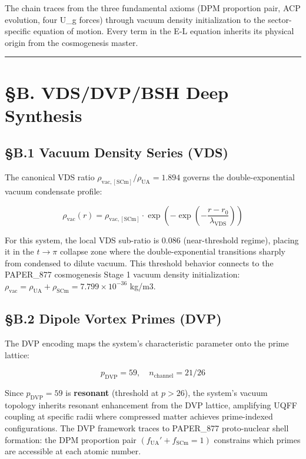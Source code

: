 \documentclass[12pt,a4paper]{article}
\begin{document}
The chain traces from the three fundamental axioms (DPM proportion pair, ACP evolution, four U\_g forces) through vacuum density initialization to the sector-specific equation of motion. Every term in the E-L equation inherits its physical origin from the cosmogenesis master.

\medskip\hrule\medskip

\section{\S{}B. VDS/DVP/BSH Deep Synthesis}

\subsection{\S{}B.1 Vacuum Density Series (VDS)}

The canonical VDS ratio $\rho_{\mathrm{vac,[SCm]}} / \rho_{\mathrm{UA}} = 1.894$ governs the double-exponential vacuum condensate profile:

\begin{equation}
\rho_{\mathrm{vac}}(r) = \rho_{\mathrm{vac,[SCm]}} \cdot \exp\!\left(-\exp\!\left(-\frac{r - r_0}{\lambda_{\mathrm{VDS}}}\right)\right)
\end{equation}

For this system, the local VDS sub-ratio is $0.086$ (near-threshold regime), placing it in the $t \to \pi$ collapse zone where the double-exponential transitions sharply from condensed to dilute vacuum. This threshold behavior connects to the PAPER\_877 cosmogenesis Stage 1 vacuum density initialization: $\rho_{\mathrm{vac}} = \rho_{\mathrm{UA}} + \rho_{\mathrm{SCm}} = 7.799 \times 10^{-36}$ kg/m3.

\subsection{\S{}B.2 Dipole Vortex Primes (DVP)}

The DVP encoding maps the system's characteristic parameter onto the prime lattice:

\begin{equation}
p_{\mathrm{DVP}} = 59, \quad n_{\mathrm{channel}} = 21/26
\end{equation}

Since $p_{\mathrm{DVP}} = 59$ is \textbf{resonant} (threshold at $p > 26$), the system's vacuum topology inherits resonant enhancement from the DVP lattice, amplifying UQFF coupling at specific radii where compressed matter achieves prime-indexed configurations. The DVP framework traces to PAPER\_877 proto-nuclear shell formation: the DPM proportion pair $(f_{\mathrm{UA}}' + f_{\mathrm{SCm}} = 1)$ constrains which primes are accessible at each atomic number.
\end{document}
